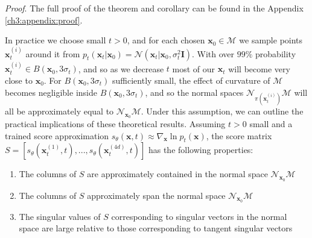 \textit{Proof}. The full proof of the theorem and corollary can be found in the Appendix \ref{ch3:appendix:proof}. 


In practice we choose small $t>0$, and for each chosen $\textbf{x}_0\in \mathcal{M}$ we sample points $\textbf{x}^{(i)}_t$ around it from $p_t(\textbf{x}_t | \textbf{x}_0) = \mathcal{N}(\textbf{x}_t | \textbf{x}_0, \sigma^2_t\textbf{I})$. With over $99\%$ probability $\textbf{x}^{(i)}_t \in B(\textbf{x}_0, 3\sigma_t)$, and so as we decrease $t$ most of our $\textbf{x}_t$ will become very close to $\textbf{x}_0$. For $B(\textbf{x}_0, 3\sigma_t)$ sufficiently small, the effect of curvature of $\mathcal{M}$ becomes negligible inside $B(\textbf{x}_0, 3\sigma_t)$, and so the normal spaces $\mathcal{N}_{\pi(\textbf{x}_t^{(i)})}\mathcal{M}$ will all be approximately equal to $\mathcal{N}_{\textbf{x}_0}\mathcal{M}$. Under this assumption, we can outline the practical implications of these theoretical results. Assuming $t>0$ small and a trained score approximation $s_\theta(\textbf{x}, t) \approx \nabla_\textbf{x} \ln p_t(\textbf{x})$, the score matrix $S=[s_{\theta}(\textbf{x}_t^{(1)},t),...,s_{\theta}(\textbf{x}_t^{(4d)},t)]$ has the following properties:
\begin{enumerate}
    \item The columns of $S$ are approximately contained in the normal space $\mathcal{N}_{\textbf{x}_0}\mathcal{M}$
    \item The columns of $S$ approximately span the normal space $\mathcal{N}_{\textbf{x}_0}\mathcal{M}$
    \item The singular values of $S$ corresponding to singular vectors in the normal space are large relative to those corresponding to tangent singular vectors 
\end{enumerate}
